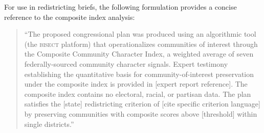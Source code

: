 For use in redistricting briefs, the following formulation provides a concise
reference to the composite index analysis:

\begin{quote}
``The proposed congressional plan was produced using an algorithmic tool
(the \textsc{bisect} platform) that operationalizes communities of interest
through the Composite Community Character Index, a weighted average of seven
federally-sourced community character signals.
Expert testimony establishing the quantitative basis for community-of-interest
preservation under the composite index is provided in [expert report reference].
The composite index contains no electoral, racial, or partisan data.
The plan satisfies the [state] redistricting criterion of [cite specific
criterion language] by preserving communities with composite scores above
[threshold] within single districts.''
\end{quote}
